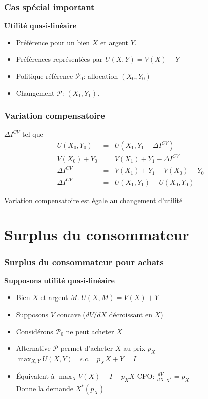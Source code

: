 \documentclass[handout]{beamer}
\newcommand{\mcl}{\mathcal}
\newcommand{\mdp}{\medskip \pause}
\begin{document}
\begin{frame} \frametitle{Cas spécial important}
\textbf{Utilité quasi-linéaire} \begin{itemize} \item Préférence pour un bien $X$ et argent $Y$.
\item Préférences représentées par
 $U(X,Y) = V(X) + Y$
\item Politique référence $\mcl P_0$: allocation $(X_0, Y_0)$
\item Changement $\mcl P$: $(X_1, Y_1)$. \end{itemize} \mdp

\end{frame}

\begin{frame} \frametitle{Variation compensatoire}

$\Delta I^{CV}$ tel que 
\begin{eqnarray*}
U(X_0,Y_0) &=& U(X_1, Y_1- \Delta I^{CV}) \\
V(X_0) + Y_0 &=& V(X_1) + Y_1 - \Delta I^{CV} \\
\Delta I^{CV} &=& V(X_1) + Y_1 - V(X_0) - Y_0 \\
\Delta I^{CV} &=& U(X_1,Y_1) - U(X_0,Y_0)
\end{eqnarray*}

Variation compensatoire est égale au changement d'utilité 
 \end{frame}

\section{Surplus du consommateur}

\begin{frame} \frametitle{Surplus du consommateur pour achats}

\textbf{Supposons utilité quasi-linéaire} \begin{itemize} \item Bien $X$
et argent $M$. $U(X,M) = V(X) + Y$ \item Supposons $V$ concave ($dV/dX$
décroissant en $X$) 
\item Considérons   $\mcl P_0$ ne peut acheter $X$  
\item Alternative $\mcl P$ permet d'acheter $X$ au prix $p_X$ \\\mdp
$\max_{X,Y} U(X,Y) \quad s.c. \quad p_X X + Y = I$

\item Équivalent à $\max_{X} V(X) + I - p_X X$
CPO: $ \frac{dV}{dX}_{|X^*} =  p_X$\\ Donne la demande $X^*(p_X)$ \end{itemize}\mdp

\end{frame}
\end{document}
